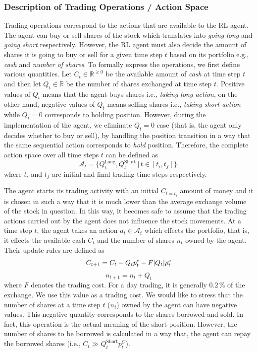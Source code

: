 \documentclass[conference]{IEEEtran}
\begin{document}
\subsubsection{Description of Trading Operations / Action Space}
Trading operations correspond to the actions that are available to the RL agent. The agent can buy or sell shares of the stock which translates into \textit{going long} and \textit{going short} respectively.  However, the RL agent must also decide the amount of shares it is going to buy or sell for a given time step \(t\) based on its portfolio e.g., \textit{cash} and \textit{number of shares}. To formally express the operations, we first define various quantities. Let \(C_{t} \in \mathds{R}^{\geq 0}\) be the available amount of \textit{cash} at time step \(t\) and then let \(Q_t \in \mathds{R}\) be the number of shares exchanged at time step \(t\). Positive values of \(Q_t\) means that the agent buys shares i.e., \textit{taking long action}, on the other hand, negative values of \(Q_t\) means selling shares i.e., \textit{taking short action} while \(Q_t = 0\) corresponds to holding position. However, during the implementation of the agent, we eliminate \(Q_t = 0\) case (that is, the agent only decides whether to buy or sell), by handling the position transition in a way that the same sequential action corresponds to \textit{hold} position. Therefore, the complete action space over all time steps \(t\) can be defined as
\begin{equation}
    \mathcal{A}_t = \{Q^{\text{Long}}_{t}, Q^{\text{Short}}_{t} \,| \, t \in [t_i, t_f]\}.
\end{equation}
where \(t_i\) and \(t_f\) are initial and final trading time steps respectively.


The agent starts its trading activity with an initial \(C_{t=t_i}\) amount of money and it is chosen in such a way that it is much lower than the average exchange volume of the stock in question. In this way, it becomes safe to assume that the trading actions carried out by the agent does not influence the stock movements. At a time step \(t\), the agent takes an action \(a_t \in \mathcal{A}_t\) which effects the portfolio, that is, it effects the available cash \(C_t\) and the number of shares \(n_t\) owned by the agent. Their update rules are defined as
\begin{equation}\label{eq:portfolio-update}
    C_{t+1} = C_t - Q_t p_{t}^{c} - F \abs{Q_t} p_{t}^{c}
\end{equation}
\begin{equation}
    n_{t+1} = n_t + Q_t
\end{equation}
where \(F\) denotes the trading cost. For a day trading, it is generally \(0.2\,\%\) of the exchange. We use this value as a trading cost. We would like to stress that the number of shares at a time step \(t\) (\(n_t\)) owned by the agent can have negative values. This negative quantity corresponds to the shares borrowed and sold. In fact, this operation is the actual meaning of the short position. However, the number of shares to be borrowed is calculated in a way that, the agent can repay the borrowed shares (i.e., \(C_{t} \gg Q_t^{\text{Short}} p_t^{C}\)).  
\end{document}

